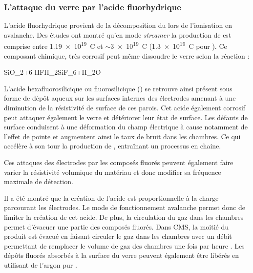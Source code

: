 \subsubsection{L'attaque du verre par l'acide fluorhydrique \texorpdfstring{}{HF}}
L'acide fluorhydrique  provient de la décomposition du  lors de l'ionisation en avalanche. Des études ont montré qu'en mode \textit{streamer} la production de  est comprise entre \num{1.19e19}\si{\per\coulomb} \cite{Lu:2009zzd} et $\sim$\num{3e19}\si{\per\coulomb} \cite{Abbrescia:2006hk} (\num{1.3e19}\si{\per\coulomb} pour \cite{Aielli:2006ih}). Ce composant chimique, très corrosif peut même dissoudre le verre selon la réaction :
\begin{chemeqn}
SiO_2+6 HF\longrightarrow H_2SiF_6+H_2O
\end{chemeqn}
L'acide hexafluorosilicique ou fluorosilicique () se retrouve ainsi présent sous forme de dépôt aqueux sur les surfaces internes des électrodes amenant à une diminution de la résistivité de surface de ces parois. Cet acide également corrosif peut attaquer également le verre et détériorer leur état de surface. Les défauts de surface conduisent à une déformation du champ électrique à cause notamment de l'effet de pointe et augmentent ainsi le taux de bruit dans les chambres. Ce qui accélère à son tour la production de , entraînant un processus en chaine.

Ces attaques des électrodes par les composés fluorés peuvent également faire varier la résistivité volumique du matériau et donc modifier sa fréquence maximale de détection.

Il a été montré que la création de l'acide  est proportionnelle à la charge parcourant les électrodes. Le mode de fonctionnement avalanche permet donc de limiter la création de cet acide. De plus, la circulation du gaz dans les chambres permet d'évacuer une partie des composés fluorés. Dans CMS, la moitié du  produit est évacué en faisant circuler le gaz dans les chambres avec un débit permettant de remplacer le volume de gaz des chambres une fois par heure \cite{Abbrescia:2006hk}. Les dépôts fluorés absorbés à la surface du verre peuvent également être libérés en utilisant de l'argon pur \cite{Band:2008zza}.

